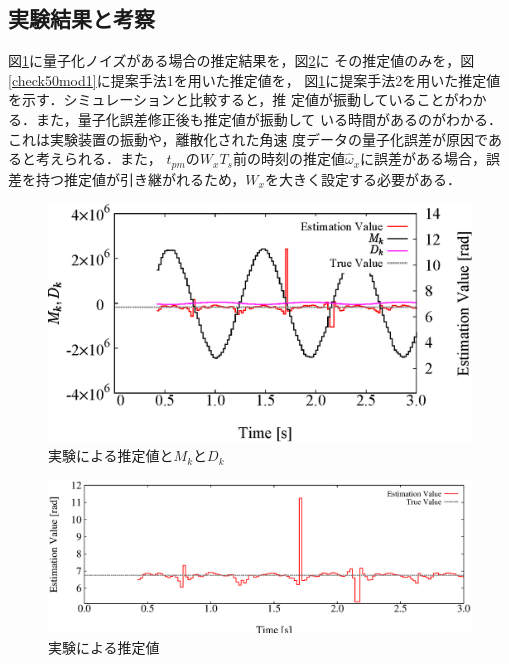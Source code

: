 \documentclass[a4paper,12pt]{jarticle}
\begin{document}
\subsection{実験結果と考察}
図\ref{check50}に量子化ノイズがある場合の推定結果を，図\ref{check50only}に
その推定値のみを，図\ref{check50mod1}に提案手法1を用いた推定値を，
図\ref{check50}に提案手法2を用いた推定値を示す．シミュレーションと比較すると，推
定値が振動していることがわかる．また，量子化誤差修正後も推定値が振動して
いる時間があるのがわかる．これは実験装置の振動や，離散化された角速
度データの量子化誤差が原因であると考えられる．また，
$t_{pm}$の$W_xT_s$前の時刻の推定値$\hat{\omega}_{x}$に誤差がある場合，誤
差を持つ推定値が引き継がれるため，$W_x$を大きく設定する必要がある．
\vspace{3cm}
\begin{figure}[htbp]
 \centering
 \includegraphics[scale=0.9]{check50.eps}
    \caption{実験による推定値と$M_k$と$D_k$}
		\label{check50}
\end{figure}
\begin{figure}[htbp]
 \centering
 \includegraphics[scale=0.7]{check50only.eps}
    \caption{実験による推定値}
		\label{check50only}
\end{figure}
\end{document}
